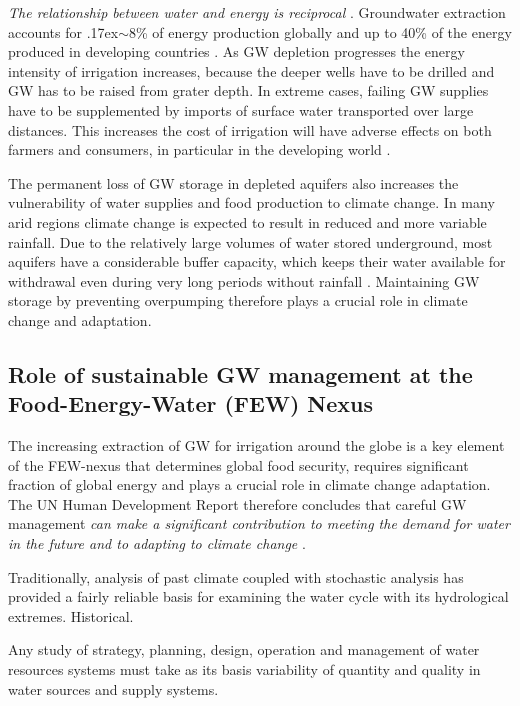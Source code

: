 \documentclass[11pt,final]{article}%
\newcommand{\mytilde}{\raise.17ex\hbox{$\scriptstyle\mathtt{\sim}$}}
\begin{document}
\emph{The relationship between water and energy is reciprocal} \cite{UNESCO2012}. Groundwater extraction accounts for \mytilde8\% of energy production globally and up to 40\% of the energy produced in developing countries \cite{WorldEconomicForum2011}.
As GW depletion progresses the energy intensity of irrigation increases, because the deeper wells have to be drilled and GW has to be raised from grater depth. In extreme cases, failing GW supplies have to be supplemented by imports of surface water transported over large distances. This increases the cost of irrigation will have adverse effects on both farmers and consumers, in particular in the developing world \cite{Narayanamoorthy2015}.

The permanent loss of GW storage in depleted aquifers also increases the vulnerability of water supplies and food production to climate change. In many arid regions climate change is expected to result in reduced and more variable rainfall. Due to the relatively large volumes of water stored underground, most aquifers have a considerable buffer capacity, which keeps their water available for withdrawal even during very long periods without rainfall  \cite{UNESCO2012}. Maintaining GW storage by preventing overpumping therefore plays a crucial role in climate change and adaptation.

\subsection{Role of sustainable GW management at the Food-Energy-Water (FEW) Nexus}
The increasing extraction of GW for irrigation around the globe is a key element of the FEW-nexus that determines global food security, requires significant fraction of global energy and plays a crucial role in climate change adaptation.  The UN Human Development Report therefore concludes that careful GW management \emph{can make a significant contribution to meeting the demand for water in the future and to adapting to climate change} \cite{UNESCO2012}.

Traditionally, analysis of past climate coupled with stochastic analysis has provided a fairly reliable basis for examining the water cycle with its hydrological extremes. Historical.

Any study of strategy, planning, design, operation and management of water resources systems must take as its basis variability of quantity and quality in water sources and supply systems. 
\end{document}

